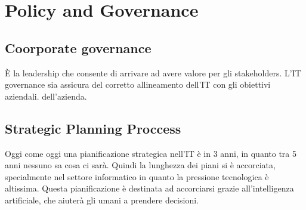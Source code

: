\chapter{Policy and Governance}
\label{PG}

\section{Coorporate governance}

È la leadership che consente di arrivare ad avere valore per gli stakeholders.
L'IT governance sia assicura del corretto allineamento dell'IT con gli 
obiettivi aziendali. dell'azienda.



\section{Strategic Planning Proccess}
\label{PG:SPP}

Oggi come oggi una pianificazione strategica nell'IT è in 3 anni, in quanto tra 
5 anni nessuno sa cosa ci sarà. Quindi la lunghezza dei piani si è accorciata, 
specialmente nel settore informatico in quanto la pressione tecnologica è 
altissima. Questa pianificazione è destinata ad accorciarsi grazie 
all'intelligenza artificiale, che aiuterà gli umani a prendere decisioni.
